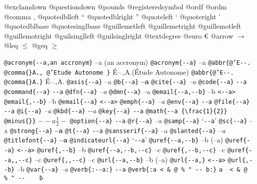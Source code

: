 \documentclass{book}
\begin{document}
\begin{titlepage}
@exclamdown \textexclamdown{}
@questiondown \textquestiondown{}
@pounds \textsterling{}
@registeredsymbol \circledR{}
@ordf \textordfeminine{}
@ordm \textordmasculine{}
@comma ,
@quotedblleft \textquotedblleft{}
@quotedblright \textquotedblright{}
@quoteleft \textquoteleft{}
@quoteright \textquoteright{}
@quotedblbase \quotedblbase{}
@quotesinglbase \quotesinglbase{}
@guillemetleft \guillemotleft{}
@guillemetright \guillemotright{}
@guillemotleft \guillemotleft{}
@guillemotright \guillemotright{}
@guilsinglleft \guilsinglleft{}
@guilsinglright \guilsinglright{}
@textdegree \textdegree{}
@euro \euro{}
@arrow $\rightarrow{}$
@leq $\leq{}$
@geq $\geq{}$

\texttt{@acronym\{{-}{-}a,an accronym\}} --a (an accronym)
\texttt{@acronym\{{-}{-}a\}} --a
\texttt{@abbr\{@'E{-}{-}. @comma\{\}A., @'Etude Autonome \}} \'{E}--.\@ ,A.\@ (\'{E}tude Autonome)
\texttt{@abbr\{@'E{-}{-}. @comma\{\}A.\}} \'{E}--.\@ ,A.\@
\texttt{@asis\{{-}{-}a\}} --a
\texttt{@b\{{-}{-}a\}} \textbf{--a}
\texttt{@cite\{{-}{-}a\}} \textit{--a}
\texttt{@code\{{-}{-}a\}} \texttt{{-}{-}a}
\texttt{@command\{{-}{-}a\}} \texttt{{-}{-}a}
\texttt{@dfn\{{-}{-}a\}} \emph{--a}
\texttt{@dmn\{{-}{-}a\}} --a
\texttt{@email\{{-}{-}a,{-}{-}b\}} --b \texttt{<{-}{-}a>}
\texttt{@email\{,{-}{-}b\}} --b
\texttt{@email\{{-}{-}a\}} \texttt{<{-}{-}a>}
\texttt{@emph\{{-}{-}a\}} \emph{--a}
\texttt{@env\{{-}{-}a\}} \texttt{{-}{-}a}
\texttt{@file\{{-}{-}a\}} \texttt{{-}{-}a}
\texttt{@i\{{-}{-}a\}} \textit{--a}
\texttt{@kbd\{{-}{-}a\}} {\ttfamily\textsl{{-}{-}a}}
\texttt{@key\{{-}{-}a\}} \texttt{{-}{-}a}
\texttt{@math\{{-}{-}a \{\textbackslash{}frac\{1\}\{2\}\} @minus\{\}\}} $--a {\frac{1}{2}} -$
\texttt{@option\{{-}{-}a\}} \texttt{{-}{-}a}
\texttt{@r\{{-}{-}a\}} \textrm{--a}
\texttt{@samp\{{-}{-}a\}} `\texttt{{-}{-}a}'
\texttt{@sc\{{-}{-}a\}} \textsc{--a}
\texttt{@strong\{{-}{-}a\}} \textbf{--a}
\texttt{@t\{{-}{-}a\}} \texttt{{-}{-}a}
\texttt{@sansserif\{{-}{-}a\}} \textsf{--a}
\texttt{@slanted\{{-}{-}a\}} \textsl{--a}
\texttt{@titlefont\{{-}{-}a\}} {\Huge \bfseries --a}
\texttt{@indicateurl\{{-}{-}a\}} `\texttt{{-}{-}a}'
\texttt{@uref\{{-}{-}a,{-}{-}b\}} --b (--a)
\texttt{@uref\{{-}{-}a\}} \texttt{<{-}{-}a>}
\texttt{@uref\{,{-}{-}b\}} --b
\texttt{@uref\{{-}{-}a,{-}{-}b,{-}{-}c\}} --c
\texttt{@uref\{,{-}{-}b,{-}{-}c\}} --c
\texttt{@uref\{{-}{-}a,,{-}{-}c\}} --c
\texttt{@uref\{,,{-}{-}c\}} --c
\texttt{@url\{{-}{-}a,{-}{-}b\}} --b (--a)
\texttt{@url\{{-}{-}a,\}} \texttt{<{-}{-}a>}
\texttt{@url\{,{-}{-}b\}} --b
\texttt{@var\{{-}{-}a\}} \emph{--a}
\texttt{@verb\{:{-}{-}a:\}} \verb:--a:
\texttt{@verb\{:a  < \& @ \% " {-}{-}    b:\}} \verb:a  < & @ % " --    b:

\end{titlepage}
\end{document}
